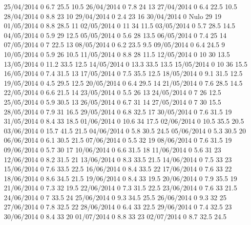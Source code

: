 25/04/2014  0      6.7    25.5   10.5 
26/04/2014  0      7.8    24     13 
27/04/2014  0      6.4    22.5   10.5 
28/04/2014  0      8.8    23     10 
29/04/2014  0      2.4    23     16 
30/04/2014  0     Nulo    29     19 
01/05/2014  0      8.8    28.5   11 
02/05/2014  0      11     34     11.5 
03/05/2014  0      5.7    28.5   14.5 
04/05/2014  0      5.9    29     12.5 
05/05/2014  0      5.6    28     13.5 
06/05/2014  0      7.4    25     14 
07/05/2014  0      7      22.5   13 
08/05/2014  0      6.2    23.5   9.5 
09/05/2014  0      6.4    24.5   9 
10/05/2014  0      5.9    26     10.5 
11/05/2014  0      8.8    28     11.5 
12/05/2014  0      10     30     13.5 
13/05/2014  0      11.2   33.5   12.5 
14/05/2014  0      13.3   33.5   13.5 
15/05/2014  0      10     36     15.5 
16/05/2014  0      7.4    31.5   13 
17/05/2014  0      7.5    35.5   12.5 
18/05/2014  0      9.1    31.5   12.5 
19/05/2014  0      4.5    29.5   12.5 
20/05/2014  0      6.4    29.5   14 
21/05/2014  0      7.6    28.5   14.5 
22/05/2014  0      6.6    21.5   14 
23/05/2014  0      5.5    26     13 
24/05/2014  0      7      26     12.5 
25/05/2014  0      5.9    30.5   13 
26/05/2014  0      6.7    31     14 
27/05/2014  0      7      30     15.5 
28/05/2014  0      7.9    31     16.5 
29/05/2014  0      6.8    32.5   17 
30/05/2014  0      7.6    31.5   19 
31/05/2014  0      8.4    33     18.5 
01/06/2014  0      10.6   34     17.5 
02/06/2014  0      10.5   35.5   20.5 
03/06/2014  0      15.7   41.5   21.5 
04/06/2014  0      5.8    30.5   24.5 
05/06/2014  0      5.3    30.5   20 
06/06/2014  0      6.1    30.5   21.5 
07/06/2014  0      5.5    32     19 
08/06/2014  0      7.6    31.5   19 
09/06/2014  0      5.7    30     17 
10/06/2014  0      6.6    31.5   18 
11/06/2014  0      5.6    31     23 
12/06/2014  0      8.2    31.5   21 
13/06/2014  0      8.3    33.5   21.5 
14/06/2014  0      7.5    33     23 
15/06/2014  0      7.6    33.5   22.5 
16/06/2014  0      8.4    33.5   22 
17/06/2014  0      7.6    33     22 
18/06/2014  0      8.6    34.5   21.5 
19/06/2014  0      8.4    33     19.5 
20/06/2014  0      7.9    35.5   19 
21/06/2014  0      7.3    32     19.5 
22/06/2014  0      7.3    31.5   22.5 
23/06/2014  0      7.6    33     21.5 
24/06/2014  0      7      33.5   24 
25/06/2014  0      9.3    34.5   25.5 
26/06/2014  0      9.3    32     25 
27/06/2014  0      7.8    32.5   22 
28/06/2014  0      6.4    33     22.5 
29/06/2014  0      7.4    32.5   23 
30/06/2014  0      8.4    33     20 
01/07/2014  0      8.8    33     23 
02/07/2014  0      8.7    32.5   24.5 
